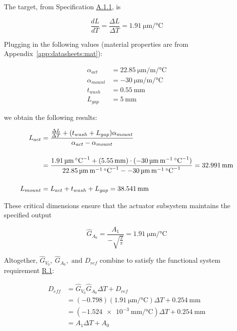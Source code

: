 \documentclass[12pt, letterpaper]{report}%
\newcounter{mycounter}           %
\newcounter{sub}[mycounter]      %
\newcommand{\specActuatorCTE}{\SI{22.85}{\micro\meter\per\meter\per\celsius}} %
\newcommand{\specMountCTE}{\SI{-30}{\micro\meter\per\meter\per\celsius}}
\newcommand{\AoneExact}{\SI{-1.524e-3}{\milli\meter\per\celsius}}
\newcommand{\AzeroExact}{\SI{0.254}{\milli\meter}}
\newcommand{\specOrigActuatorLength}{\SI{32.991}{\milli \meter}}
\newcommand{\GA}{\SI{1.91}{\micro\meter\per\celsius}}
\newcommand{\GV}{\num{-0.798}}
\newcommand{\specref}[1]{\hyperref[tab:specs]{#1}}
\begin{document}
			The target, from Specification \specref{A.1.1}, is

			\begin{equation}
				\frac{dL}{dT} = \frac{\Delta L}{\Delta T} = \GA
			\end{equation}

			Plugging in the following values (material properties are from Appendix~\ref{app:datasheets:mat}):

			\begin{align*}
				\alpha_{act} &= \specActuatorCTE \\
				\alpha_{mount} &= \specMountCTE \\
				t_{wash} &= \SI{0.55}{\milli\meter} \\
				L_{gap} &= \SI{5}{\milli\meter}
			\end{align*}

			we obtain the following results:

			\begin{align}
				L_{act} &= \frac{\frac{\Delta L}{\Delta T} + (t_{wash} + L_{gap}) \alpha_{mount}}{\alpha_{act} - \alpha_{mount}} \notag \\[12pt]
				&= \frac{\GA + (\SI{5.55}{\milli\meter}) \cdot (\specMountCTE)}{\specActuatorCTE - \specMountCTE} = \specOrigActuatorLength \label{eq:L_act}\\[12pt]
				L_{mount} &= L_{act} + t_{wash} + L_{gap} = \SI{38.541}{\milli\meter} \label{eq:L_mount}
			\end{align}

			These critical dimensions ensure that the actuator subsystem maintains the specified output

			\begin{equation}
				\hat{G}_{A_0} = \frac{A_1}{-\sqrt{\frac{2}{\pi}}} = \GA
			\end{equation}

			Altogether, $\hat{G}_{V_0},\ \hat{G}_{A_0}, \text{ and } D_{ref}$ combine to satisfy the functional system requirement \specref{R.1}:
			
			\begin{equation}
				\begin{aligned}
					D_{eff} &= \hat{G}_{V_0} \hat{G}_{A_0} \Delta T + D_{ref} \\
					&= \left( \GV \right) \left( \GA \right) \Delta T + \AzeroExact \\
					&= \left( \AoneExact \right) \Delta T + \AzeroExact \\
					&= A_1 \Delta T + A_0
				\end{aligned}
			\end{equation}
\end{document}
